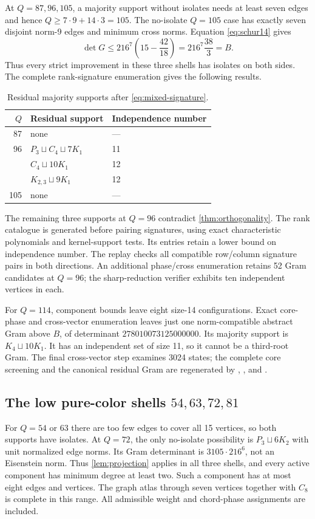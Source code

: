 At $Q=87,96,105$, a majority support without isolates needs at least seven edges and hence $Q\ge7\cdot9+14\cdot3=105$. The no-isolate $Q=105$ case has exactly seven disjoint norm-9 edges and minimum cross norms. Equation \eqref{eq:schur14} gives
\[
 \det G\le216^7\left(15-\frac{42}{18}\right)
          =216^7\frac{38}{3}=B.
\]
Thus every strict improvement in these three shells has isolates on both sides. The complete rank-signature enumeration gives the following results.
\begin{table}[ht]
\centering\caption{Residual majority supports after \eqref{eq:mixed-signature}.}\label{tab:mixed}
\begin{tabular}{@{}rll@{}}\toprule
$Q$ & Residual support & Independence number\\\midrule
87 & none & ---\\
96 & $P_3\sqcup C_4\sqcup7K_1$ &11\\
   & $C_4\sqcup10K_1$ &12\\
   & $K_{2,3}\sqcup9K_1$ &12\\
105 & none & ---\\\bottomrule
\end{tabular}
\end{table}
The remaining three supports at $Q=96$ contradict \cref{thm:orthogonality}. The rank catalogue is generated before pairing signatures, using exact characteristic polynomials and kernel-support tests. Its entries retain a lower bound on independence number. The replay checks all compatible row/column signature pairs in both directions. An additional phase/cross enumeration retains 52 Gram candidates at $Q=96$; the sharp-reduction verifier exhibits ten independent vertices in each.

For $Q=114$, component bounds leave eight size-14 configurations. Exact core-phase and cross-vector enumeration leaves just one norm-compatible abstract Gram above $B$, of determinant $278010073125000000$. Its majority support is $K_4\sqcup10K_1$. It has an independent set of size 11, so it cannot be a third-root Gram. The final cross-vector step examines 3024 states; the complete core screening and the canonical residual Gram are regenerated by , , and .

\subsection{The low pure-color shells \texorpdfstring{$54,63,72,81$}{54,63,72,81}}
For $Q=54$ or 63 there are too few edges to cover all 15 vertices, so both supports have isolates. At $Q=72$, the only no-isolate possibility is $P_3\sqcup6K_2$ with unit normalized edge norms. Its Gram determinant is $3105\cdot216^6$, not an Eisenstein norm. Thus \cref{lem:projection} applies in all three shells, and every active component has minimum degree at least two. Such a component has at most eight edges and vertices. The graph atlas through seven vertices together with $C_8$ is complete in this range. All admissible weight and chord-phase assignments are included.

